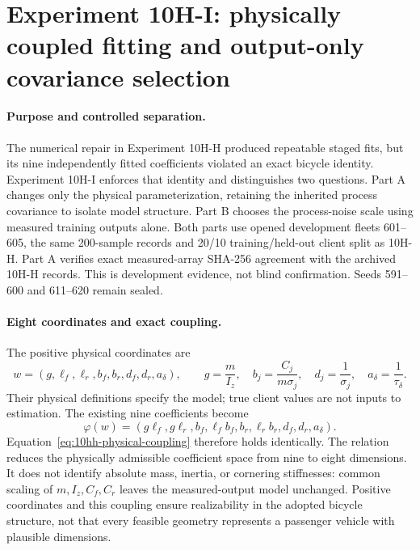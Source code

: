 \section{Experiment 10H-I: physically coupled fitting and output-only covariance selection}
\label{sec:experiment10hi}

\paragraph{Purpose and controlled separation.}
The numerical repair in Experiment 10H-H produced repeatable staged fits, but
its nine independently fitted coefficients violated an exact bicycle identity.
Experiment 10H-I enforces that identity and distinguishes two questions.
Part A changes only the physical parameterization, retaining the inherited
process covariance to isolate model structure. Part B chooses the process-noise
scale using measured training outputs alone. Both parts use opened development
fleets 601--605, the same 200-sample records and 20/10 training/held-out client
split as 10H-H. Part A verifies exact measured-array SHA-256 agreement with
the archived 10H-H records. This is development evidence, not blind
confirmation. Seeds 591--600 and 611--620 remain sealed.

\paragraph{Eight coordinates and exact coupling.}
The positive physical coordinates are
\begin{equation}
 w=(g,\ell_f,\ell_r,b_f,b_r,d_f,d_r,a_\delta),\qquad
 g=\frac{m}{I_z},\quad b_j=\frac{C_j}{m\sigma_j},\quad
 d_j=\frac{1}{\sigma_j},\quad a_\delta=\frac{1}{\tau_\delta}.
\end{equation}
Their physical definitions specify the model; true client values are not
inputs to estimation. The existing nine coefficients become
\begin{equation}
 \varphi(w)=
 (g\ell_f,g\ell_r,b_f,\ell_f b_f,b_r,\ell_r b_r,d_f,d_r,a_\delta).
 \label{eq:10hi-map}
\end{equation}
Equation~\eqref{eq:10hh-physical-coupling} therefore holds identically.
The relation reduces the physically admissible coefficient space from nine
to eight dimensions.
It does not identify absolute mass, inertia, or cornering stiffnesses:
common scaling of $m,I_z,C_f,C_r$ leaves the measured-output model unchanged.
Positive coordinates and this coupling ensure realizability in the adopted
bicycle structure, not that every feasible geometry represents a passenger
vehicle with plausible dimensions.

